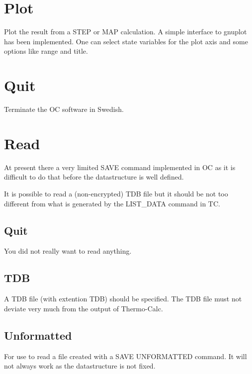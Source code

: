 \documentclass[12pt]{article}
\begin{document}
\section{Plot }

Plot the result from a STEP or MAP calculation.  A simple interface to
gnuplot has been implemented.  One can select state variables for the
plot axis and some options like range and title.

\section{Quit }

Terminate the OC software in Swedish.

\section{Read }

At present there a very limited SAVE command implemented in OC as it
is difficult to do that before the datastructure is well defined.

It is possible to read a (non-encrypted) TDB file but it should be not
too different from what is generated by the LIST\_DATA command in TC.

\subsection{Quit}

You did not really want to read anything.

\subsection{TDB}

A TDB file (with extention TDB) should be specified.  The TDB file
must not deviate very much from the output of Thermo-Calc.

\subsection{Unformatted}

For use to read a file created with a SAVE UNFORMATTED command.  It
will not always work as the datastructure is not fixed.
\end{document}
